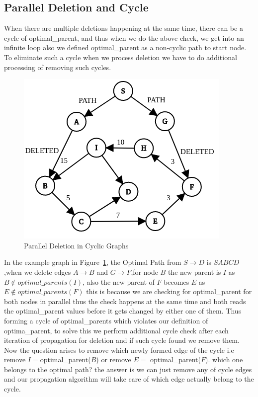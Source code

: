 \documentclass[a4paper]{article}
\begin{document}
\subsection{Parallel Deletion and Cycle}\label{subsec:parallel_cycle}
When there are multiple deletions happening at the same time, there can be a cycle of optimal\_parent, and thus when we do the above check, we get into an infinite loop also we defined optimal\_parent as a non-cyclic path to start node. To eliminate such a cycle when we process deletion we have to do additional processing of removing such cycles.
\begin{figure}[H]
    \centering
    \includegraphics[scale=0.45]{img/Delete_cycle.png}
    \caption{Parallel Deletion in Cyclic Graphs}
    \label{fig:delete_parallel_cycle}
\end{figure}

In the example graph in Figure~\ref{fig:delete_parallel_cycle}, the Optimal Path from $S\rightarrow D$ is $SABCD$,when we delete edges $A \rightarrow B$ and $G \rightarrow F$,for node $B$ the new parent is $I$ as $B \notin optimal\_parents(I)$, also the new parent of $F$ becomes $E$ as $E \notin optimal\_parents(F)$ this is because we are checking for optimal\_parent for both nodes in parallel thus the check happens at the same time and both reads the optimal\_parent values before it gets changed by either one of them. Thus forming a cycle of optimal\_parents which violates our definition of optima\_parent, to solve this we perform additional cycle check after each iteration of propagation for deletion and if such cycle found we remove them.\\
Now the question arises to remove which newly formed edge of the cycle i.e remove $I= $optimal\_parent($B$) or remove $E=$ optimal\_parent($F$). which one belongs to the optimal path? the answer is we can just remove any of cycle edges and our propagation algorithm will take care of which edge actually belong to the cycle.\\
\end{document}
